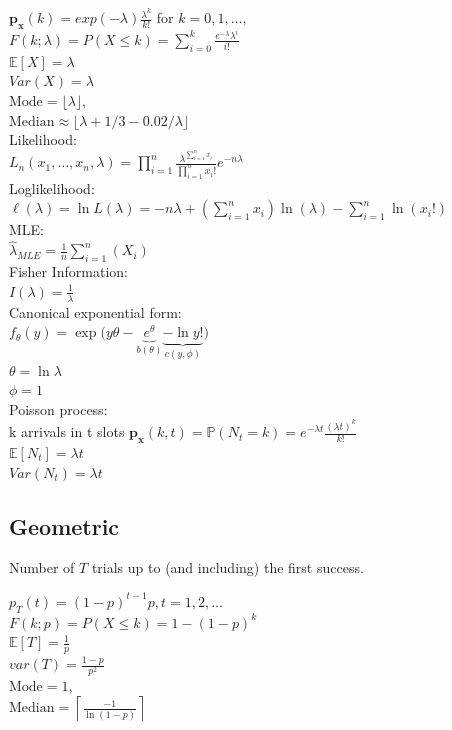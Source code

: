 $\mathbf{p_x}(k)=exp(-\lambda)\frac{\lambda^k}{k!}$ for $k=0,1, \ldots,$\\
$F(k; \lambda) = P(X \leq k) = \sum_{i=0}^{k} \frac{e^{-\lambda} \lambda^{i}}{i!}$\\
$\mathbb{E}[X]=\lambda$\\
$Var(X)=\lambda$\\
$\text{Mode} = \lfloor \lambda \rfloor,\quad$\\
$\text{Median} \approx \lfloor \lambda + 1/3 - 0.02/\lambda \rfloor$\\

Likelihood:\\
$L_ n(x_1, \ldots , x_ n, \lambda) = \prod _{i = 1}^ n \frac{\lambda^{\sum_{i=1}^{n} x_i}}{\prod _{i = 1}^ n x_i!} e^{-n\lambda}$\\
Loglikelihood:\\
$\ell(\lambda) = \ln L(\lambda) 
= -n\lambda + \left(\sum_{i=1}^{n} x_i\right)\ln(\lambda) - \sum_{i=1}^{n}\ln(x_i!)$\\
MLE:\\
$\hat{\lambda}_{MLE} = \frac{1}{n} \sum^n_{i=1}(X_i)$\\
Fisher Information:\\
$I(\lambda)= \frac{1}{\lambda}$\\
Canonical exponential form:\\
$ f_{\theta}(y) = \exp\big(y\theta - \underbrace{e^\theta}_{b(\theta)} \underbrace{- \ln y!}_{c(y, \phi)}\big)$\\
$\theta = \ln \lambda$\\
$\phi = 1$\\
Poisson process:\\
k arrivals in t slots
$\mathbf{p_x}(k,t) = \mathbb{P}(N_t=k)=e^{-\lambda t} \frac{(\lambda t)^k}{k!}$\\
$\mathbb{E}[N_t]=\lambda t$\\
$Var(N_t)=\lambda t$

\subsection*{Geometric}
Number of $T$ trials up to (and including) the first success. 

$p_T(t) = (1-p)^{t-1}p, t=1,2,...$\\
$F(k; p) = P(X \leq k) = 1 - (1 - p)^k$\\
$\mathbb{E}[T]=\frac{1}{p}$\\
$var(T)=\frac{1-p}{p^2}$\\
$\text{Mode} = 1,\quad$ \\
$\text{Median} = \left\lceil \frac{-1}{\ln(1-p)} \right\rceil$\\


